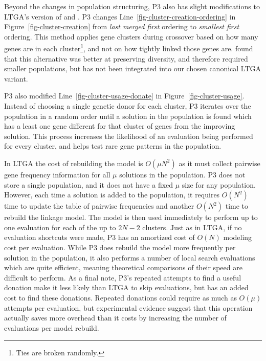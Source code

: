 \documentclass[twoside]{article}
\begin{document}
Beyond the changes in population structuring, P3 also has slight modifications to
LTGA's version of  and .
P3 changes Line~\ref{fig-cluster-creation-ordering} in Figure~\ref{fig-cluster-creation}
from \emph{last merged first} ordering to \emph{smallest first} ordering.
This method applies gene clusters during crossover based on how many genes
are in each cluster\footnote{Ties are broken randomly.}, and not on how tightly linked those genes are.
\cite{goldman:2012:ltga} found that this alternative was better at preserving
diversity, and therefore required smaller populations, but has  not been integrated into
our chosen canonical LTGA variant.

P3 also modified Line~\ref{fig-cluster-usage-donate} in Figure~\ref{fig-cluster-usage}.
Instead of choosing a single genetic donor for each cluster, P3 iterates over the
population in a random order until a solution in the population is found which
has a least one gene different for that cluster of genes from the improving solution.
This process increases the likelihood of an evaluation being performed for every cluster,
and helps test rare gene patterns in the population.

In LTGA the cost of rebuilding the model is $O(\mu N^2)$ as it must collect pairwise
gene frequency information for all $\mu$ solutions in the population. P3 does not store
a single population, and it does not have a fixed $\mu$ size for any population. However,
each time a solution is added to the population, it requires $O(N^2)$ time to update
the table of pairwise frequencies and another $O(N^2)$ time to rebuild the linkage model.
The model is then used immediately to perform up to one evaluation for each of the up
to $2N-2$ clusters. Just as in LTGA, if no evaluation shortcuts were made, P3
has an amortized cost of $O(N)$ modeling cost per evaluation. While P3 does
rebuild the model more frequently per solution in the population, it also performs
a number of local search evaluations which are quite efficient, meaning theoretical
comparisons of their speed are difficult to perform. As a final note, P3's repeated
attempts to find a useful donation make it less likely than LTGA to skip evaluations,
but has an added cost to find these donations. Repeated donations could require as much
as $O(\mu)$ attempts per evaluation, but experimental evidence suggest that this
operation actually saves more overhead than it costs by increasing the number of evaluations
per model rebuild.
\end{document}
